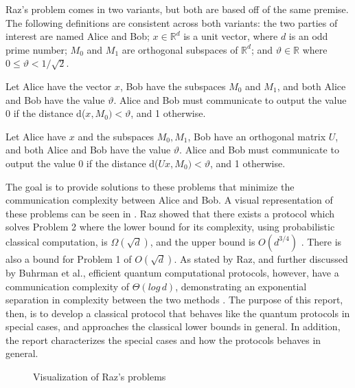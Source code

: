 \documentclass[../3Wworkreport.tex]{subfiles}
\begin{document}
Raz's problem \parencite{Raz1999} comes in two variants, but both are based off of the same premise. The following definitions are consistent across both variants: the two parties of interest are named Alice and Bob; $x \in \mathbb{R}^d$ is a unit vector, where $d$ is an odd prime number; $M_0$ and $M_1$ are orthogonal subspaces of $\mathbb{R}^d$; and $\vartheta \in \mathbb{R}$ where $0 \le \vartheta < 1/\sqrt{2}$.
\begin{prob}
Let Alice have the vector $x$, Bob have the subspaces $M_0$ and $M_1$, and both Alice and Bob have the value $\vartheta$. Alice and Bob must communicate to output the value 0 if the distance d($x,M_0) < \vartheta$, and 1 otherwise.
\end{prob}

\begin{prob}
Let Alice have $x$ and the subspaces $M_0, M_1$, Bob have an orthogonal matrix $U$, and both Alice and Bob have the value $\vartheta$. Alice and Bob must communicate to output the value 0 if the distance d($Ux,M_0) < \vartheta$, and 1 otherwise.
\end{prob}

The goal is to provide solutions to these problems that minimize the communication complexity between Alice and Bob. A visual representation of these problems can be seen in . Raz showed that there exists a protocol which solves Problem 2 where the lower bound for its complexity, using probabilistic classical computation, is $\Omega(\sqrt{d})$, and the upper bound is $O(d^{3/4})$ \parencite{Raz1999}. There is also a bound for Problem 1 of $O(\sqrt{d})$. As stated by Raz, and further discussed by Buhrman et al., efficient quantum computational protocols, however, have a communication complexity of $\Theta(log\,d)$, demonstrating an exponential separation in complexity between the two methods \parencite{Buhrman2009}. The purpose of this report, then, is to develop a classical protocol that  behaves like the quantum protocols in special cases, and approaches the classical lower bounds in general. In addition, the report characterizes the special cases and how the protocols behaves in general.

\begin{figure}[!h]
\begin{center}
\end{center}
\caption{Visualization of Raz's problems}
\label{fig:razproblem}
\end{figure}
\end{document}
